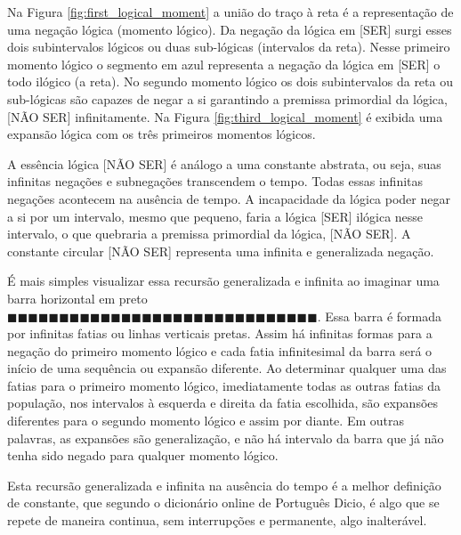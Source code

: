 Na Figura \ref{fig:first_logical_moment} a união do traço à reta é a representação de uma negação lógica (momento lógico). Da negação da lógica em [SER] surgi esses dois subintervalos lógicos ou duas sub-lógicas (intervalos da reta). Nesse primeiro momento lógico o segmento em azul representa a negação da lógica em [SER] o todo ilógico (a reta). No segundo momento lógico os dois subintervalos da reta ou sub-lógicas são capazes de negar a si garantindo a premissa primordial da lógica, [NÃO SER] infinitamente. Na Figura \ref{fig:third_logical_moment} é exibida uma expansão lógica com os três primeiros momentos lógicos.

A essência lógica [NÃO SER] é análogo a uma constante abstrata, ou seja, suas infinitas negações e subnegações transcendem o tempo. Todas essas infinitas negações acontecem na ausência de tempo. A incapacidade da lógica poder negar a si por um intervalo, mesmo que pequeno, faria a lógica [SER] ilógica nesse intervalo, o que quebraria a premissa primordial da lógica, [NÃO SER]. A constante circular [NÃO SER] representa uma infinita e generalizada negação.

É mais simples visualizar essa recursão generalizada e infinita ao imaginar uma barra horizontal em preto $\!\blacksquare\!\blacksquare\!\blacksquare\!\blacksquare\!\blacksquare\!\blacksquare\!\blacksquare\!\blacksquare\!\blacksquare\!\blacksquare\!\blacksquare\!\blacksquare\!\blacksquare\!\blacksquare\!\blacksquare\!\blacksquare\!\blacksquare\!\blacksquare\!\blacksquare\!\blacksquare\!\blacksquare\!\blacksquare\!\blacksquare\!\blacksquare\!\blacksquare\!\blacksquare\!\blacksquare\!\blacksquare\!\blacksquare\!\blacksquare$. Essa barra é formada por infinitas fatias ou linhas verticais pretas. Assim há infinitas formas para a negação do primeiro momento lógico e cada fatia infinitesimal da barra será o início de uma sequência ou expansão diferente. Ao determinar qualquer uma das fatias para o primeiro momento lógico, imediatamente todas as outras fatias da população, nos intervalos à esquerda e direita da fatia escolhida, são expansões diferentes para o segundo momento lógico e assim por diante. Em outras palavras, as expansões são generalização, e não há intervalo da barra que já não tenha sido negado para qualquer momento lógico. 

Esta recursão generalizada e infinita na ausência do tempo é a melhor definição de constante, que segundo o dicionário online de Português Dicio\cite{dicio_constante}, é algo que se repete de maneira continua, sem interrupções e permanente, algo inalterável.

